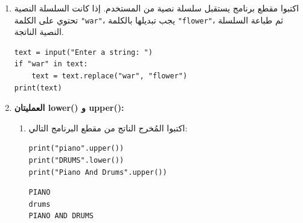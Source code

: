 \documentclass[14pt]{extarticle}
\begin{document}
\begin{enumerate}[resume, label=\textbf{تمرين \arabic*:}, wide=0pt, itemsep=2.2em]
\begin{enumerate}[label=\alph*.]
\item ماذا تنفّذ العملية \textenglish{find(sub, begin, end)}؟
\ifwithsols
\begin{boxSolution}
تبحث عن السلسلة النصية الجزئية \textenglish{sub} داخل السلسلة النصية الأصلية بدءًا من المؤشر \textenglish{begin} وحتى المؤشر \textenglish{end} (لا يشمل \textenglish{end})، وتعيد مؤشر أول ظهور لها، أو تعيد $-1$ إذا لم توجد في هذا المجال.
\end{boxSolution}
\fi
\filbreak
\end{enumerate}
\filbreak

\item اكتبوا مقطع برنامج يستقبل سلسلة نصية من المستخدم. إذا كانت السلسلة النصية تحتوي على الكلمة \textenglish{\texttt{"war"}}، يجب تبديلها بالكلمة \textenglish{\texttt{"flower"}}، ثم طباعة السلسلة النصية الناتجة.

\ifwithsols
\begin{boxSolution}
\begin{english}
\begin{verbatim}
text = input("Enter a string: ")
if "war" in text:
    text = text.replace("war", "flower")
print(text)
\end{verbatim}
\end{english}
\end{boxSolution}
\fi
\filbreak

\item \textbf{العمليتان \textenglish{lower()} و \textenglish{upper()}:}
\begin{enumerate}[label=\alph*.]
\item اكتبوا المُخرج الناتج من مقطع البرنامج التالي:

\begin{boxCode}
\begin{english}
\begin{verbatim}
print("piano".upper())
print("DRUMS".lower())
print("Piano And Drums".upper())
\end{verbatim}
\end{english}
\end{boxCode}

\ifwithsols
\begin{boxSolution}
\begin{english}
\begin{verbatim}
PIANO
drums
PIANO AND DRUMS
\end{verbatim}
\end{english}
\end{boxSolution}
\fi
\filbreak


\end{enumerate}
\end{enumerate}
\end{document}
